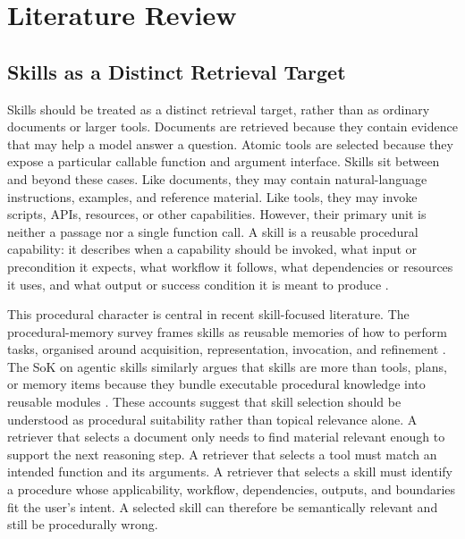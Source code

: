 \chapter{Literature Review}

\section{Skills as a Distinct Retrieval Target}

Skills should be treated as a distinct retrieval target, rather than as ordinary documents or larger tools. Documents are retrieved because they contain evidence that may help a model answer a question. Atomic tools are selected because they expose a particular callable function and argument interface. Skills sit between and beyond these cases. Like documents, they may contain natural-language instructions, examples, and reference material. Like tools, they may invoke scripts, APIs, resources, or other capabilities. However, their primary unit is neither a passage nor a single function call. A skill is a reusable procedural capability: it describes when a capability should be invoked, what input or precondition it expects, what workflow it follows, what dependencies or resources it uses, and what output or success condition it is meant to produce \cite{jiang2026procedural,jiang2026sok,anthropic2025skills}.

This procedural character is central in recent skill-focused literature. The procedural-memory survey frames skills as reusable memories of how to perform tasks, organised around acquisition, representation, invocation, and refinement \cite{jiang2026procedural}. The SoK on agentic skills similarly argues that skills are more than tools, plans, or memory items because they bundle executable procedural knowledge into reusable modules \cite{jiang2026sok}. These accounts suggest that skill selection should be understood as procedural suitability rather than topical relevance alone. A retriever that selects a document only needs to find material relevant enough to support the next reasoning step. A retriever that selects a tool must match an intended function and its arguments. A retriever that selects a skill must identify a procedure whose applicability, workflow, dependencies, outputs, and boundaries fit the user's intent. A selected skill can therefore be semantically relevant and still be procedurally wrong.

